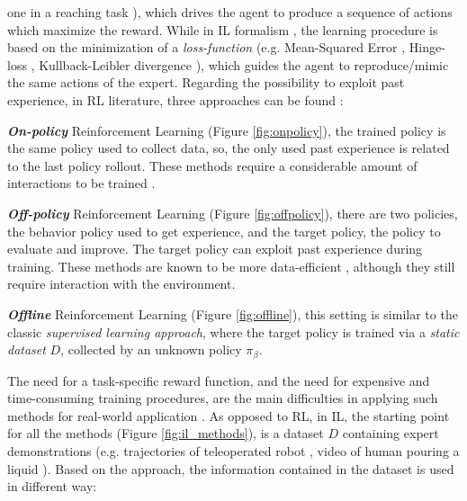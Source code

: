 one in a reaching task \cite{}), which drives the agent to produce a sequence of actions which maximize the reward.
While in IL formalism \cite{osa2018algorithmic}, the learning procedure is based on the minimization of a
\textit{loss-function} (e.g. Mean-Squared Error \cite{james2013introduction_to_sl}, Hinge-loss \cite{cortes1995support},
Kullback-Leibler divergence \cite{kullback1951information}), which guides the agent to reproduce/mimic the same actions
of the expert. \newline Regarding the possibility to exploit past experience, in RL literature, three approaches can be
found \cite{levine202rl_tutorial}:
\begin{itemize*}
    \item \textbf{\textit{On-policy}} Reinforcement Learning (Figure \ref{fig:onpolicy}), the trained policy is the same
    policy used to collect data, so, the only used past experience is related to the last policy rollout. These methods
    require a considerable amount of interactions to be trained \cite{}.
    \item \textbf{\textit{Off-policy}} Reinforcement Learning (Figure \ref{fig:offpolicy}), there are two policies, the
    behavior policy used to get experience, and the target policy, the policy to evaluate and improve. The target policy
    can exploit past experience during training. These methods are known to be more data-efficient \cite{}, although
    they still require interaction with the environment. 
    \item \textbf{\textit{Offline}} Reinforcement Learning (Figure \ref{fig:offline}), this setting is similar to the
    classic \textit{supervised learning approach}, where the target policy is trained via a \textit{static dataset} $D$,
    collected by an unknown policy $\pi_{\beta}$.  
\end{itemize*}

\noindent The need for a task-specific reward function, and the need for expensive and time-consuming training
procedures, are the main difficulties in applying such methods for real-world application
\cite{hussein2017imitation_learning_survey}. \newline As opposed to RL, in IL, the starting point for all the methods
(Figure \ref{fig:il_methods}), is a dataset $D$ containing expert demonstrations (e.g. trajectories of teleoperated
robot \cite{}, video of human pouring a liquid \cite{}). Based on the approach, the information contained in the dataset
is used in different way:
